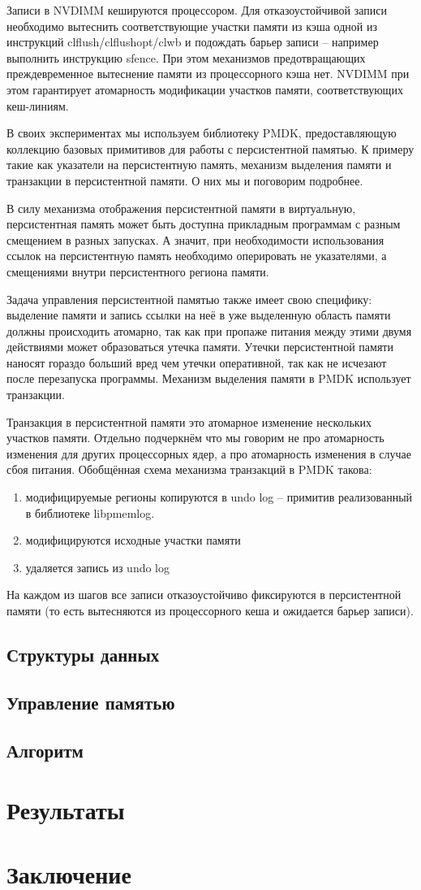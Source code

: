 \documentclass[pdftex,ptm,12pt,a4paper]{report}
\theoremstyle{definition}
\begin{document}
Записи в NVDIMM кешируются процессором. Для отказоустойчивой записи необходимо вытеснить соответствующие участки памяти из кэша одной из инструкций clflush/clflushopt/clwb
и подождать барьер записи -- например выполнить инструкцию sfence. При этом механизмов предотвращающих преждевременное вытеснение памяти из процессорного кэша нет.
NVDIMM при этом гарантирует атомарность модификации участков памяти, соответствующих кеш-линиям.

В своих экспериментах мы используем библиотеку PMDK, предоставляющую коллекцию базовых примитивов для работы с персистентной памятью.
К примеру такие как указатели на персистентную память, механизм выделения памяти и транзакции в персистентной памяти. О них мы и поговорим подробнее.

В силу механизма отображения персистентной памяти в виртуальную, персистентная память может быть доступна прикладным программам с разным смещением в разных запусках.
А значит, при необходимости использования ссылок на персистентную память необходимо оперировать не указателями, а смещениями внутри персистентного региона памяти.

Задача управления персистентной памятью также имеет свою специфику: выделение памяти и запись ссылки на неё в уже выделенную область памяти должны происходить атомарно, так как
при пропаже питания между этими двумя действиями может образоваться утечка памяти. Утечки персистентной памяти наносят гораздо больший вред чем утечки оперативной,
так как не исчезают после перезапуска программы. Механизм выделения памяти в PMDK использует транзакции.

Транзакция в персистентной памяти это атомарное изменение нескольких участков памяти. Отдельно подчеркнём что мы говорим не про атомарность изменения для других процессорных ядер, а
про атомарность изменения в случае сбоя питания.
Обобщённая схема механизма транзакций в PMDK такова:
\begin{enumerate}
    \item модифицируемые регионы копируются в undo log -- примитив реализованный в библиотеке libpmemlog.
    \item модифицируются исходные участки памяти
    \item удаляется запись из undo log
\end{enumerate}
На каждом из шагов все записи отказоустойчиво фиксируются в персистентной памяти (то есть вытесняются из процессорного кеша и ожидается барьер записи).

\section{Структуры данных}

\section{Управление памятью}
\section{Алгоритм}

\chapter{Результаты}

\chapter{Заключение}



\end{document}
